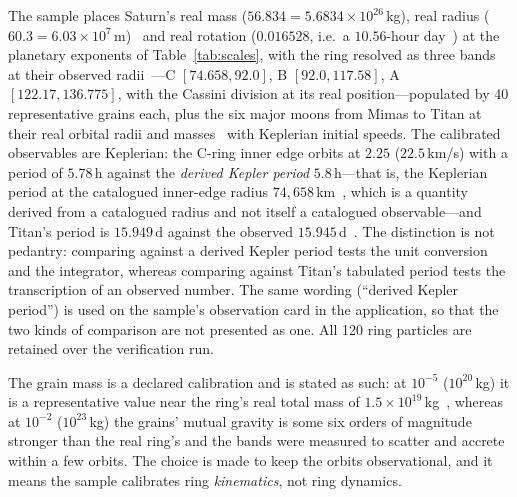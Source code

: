 \documentclass[aps,reprint,amsmath,amssymb,nofootinbib,superscriptaddress,floatfix]{revtex4-2}
\begin{document}
The sample places Saturn's real mass ($56.834=5.6834\times10^{26}$\,kg),
real radius ($60.3=6.03\times10^{7}$\,m)~\cite{Prsa2016,NASAFact} and
real rotation ($0.016528$, i.e.\ a $10.56$-hour
day~\cite{Mankovich2019}) at the planetary exponents of
Table~\ref{tab:scales}, with the ring resolved as three bands at their
observed radii~\cite{NASAFact}---C $[74.658,92.0]$, B $[92.0,117.58]$,
A $[122.17,136.775]$, with the Cassini division at its real
position---populated by 40 representative grains each, plus the six
major moons from Mimas to Titan at their real orbital radii and
masses~\cite{Jacobson2006,NASAFact} with Keplerian initial speeds.
The calibrated observables are Keplerian: the C-ring inner edge orbits
at $2.25$ ($22.5$\,km/s) with a period of $5.78$\,h against the
\emph{derived Kepler period} $5.8$\,h---that is, the Keplerian period at
the catalogued inner-edge radius $74{,}658$\,km~\cite{NASAFact}, which
is a quantity derived from a catalogued radius and not itself a
catalogued observable---and Titan's period is $15.949$\,d against the
observed $15.945$\,d~\cite{Jacobson2006,NASAFact}.
The distinction is not pedantry: comparing against a derived Kepler
period tests the unit conversion and the integrator, whereas comparing
against Titan's tabulated period tests the transcription of an observed
number.
The same wording (``derived Kepler period'') is used on the sample's
observation card in the application, so that the two kinds of
comparison are not presented as one.
All 120 ring particles are retained over the verification run.

The grain mass is a declared calibration and is stated as such: at
$10^{-5}$ ($10^{20}$\,kg) it is a representative value near the ring's
real total mass of $1.5\times10^{19}$\,kg~\cite{Iess2019},
whereas at $10^{-2}$
($10^{23}$\,kg) the grains' mutual gravity is some six orders of
magnitude stronger than the real ring's and the bands were measured to
scatter and accrete within a few orbits.
The choice is made to keep the orbits observational, and it means the
sample calibrates ring \emph{kinematics}, not ring dynamics.
\end{document}
